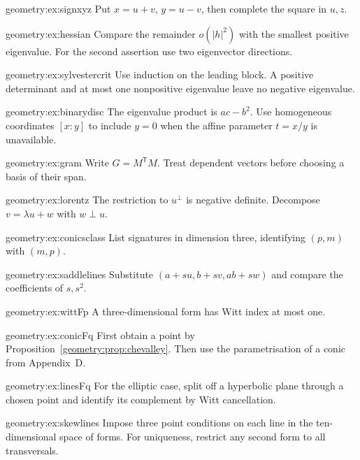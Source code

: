 \begin{hint}{geometry:ex:signxyz}
Put $x=u+v$, $y=u-v$, then complete the square in $u,z$.
\end{hint}
\begin{hint}{geometry:ex:hessian}
Compare the remainder $o(|h|^2)$ with the smallest positive eigenvalue.
For the second assertion use two eigenvector directions.
\end{hint}
\begin{hint}{geometry:ex:sylvestercrit}
Use induction on the leading block. A positive determinant and at most
one nonpositive eigenvalue leave no negative eigenvalue.
\end{hint}
\begin{hint}{geometry:ex:binarydisc}
The eigenvalue product is $ac-b^2$. Use homogeneous coordinates $[x:y]$
to include $y=0$ when the affine parameter $t=x/y$ is unavailable.
\end{hint}
\begin{hint}{geometry:ex:gram}
Write $G=M^{\mathsf T}M$. Treat dependent vectors before choosing a basis
of their span.
\end{hint}
\begin{hint}{geometry:ex:lorentz}
The restriction to $u^\perp$ is negative definite. Decompose
$v=\lambda u+w$ with $w\perp u$.
\end{hint}
\begin{hint}{geometry:ex:conicsclass}
List signatures in dimension three, identifying $(p,m)$ with $(m,p)$.
\end{hint}
\begin{hint}{geometry:ex:saddlelines}
Substitute $(a+su,b+sv,ab+sw)$ and compare the coefficients of $s,s^2$.
\end{hint}
\begin{hint}{geometry:ex:wittFp}
A three-dimensional form has Witt index at most one.
\end{hint}
\begin{hint}{geometry:ex:conicFq}
First obtain a point by Proposition~\ref{geometry:prop:chevalley}.
Then use the parametrisation of a conic from Appendix~D.
\end{hint}
\begin{hint}{geometry:ex:linesFq}
For the elliptic case, split off a hyperbolic plane through a chosen
point and identify its complement by Witt cancellation.
\end{hint}
\begin{hint}{geometry:ex:skewlines}
Impose three point conditions on each line in the ten-dimensional space
of forms. For uniqueness, restrict any second form to all transversals.
\end{hint}
